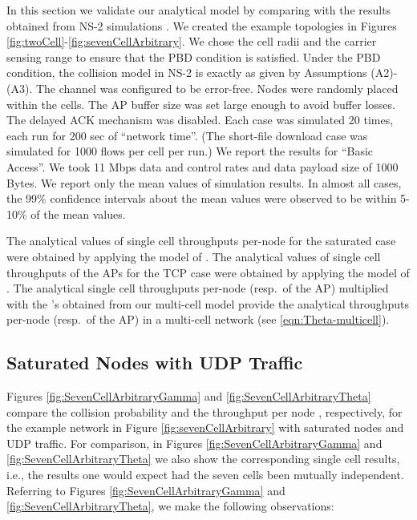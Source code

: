 \documentclass[10pt,a4paper,journal]{IEEEtran}
\theoremstyle{definition}
\theoremstyle{remark}
\theoremstyle{plain}
\begin{document}
In this section we validate our analytical model by comparing with the results obtained from NS-2 simulations \cite{wanet.ns2}. We created the example topologies in Figures \ref{fig:twoCell}-\ref{fig:sevenCellArbitrary}. We chose the cell radii and the carrier sensing range to ensure that the PBD condition is satisfied. Under the PBD condition, the collision model in NS-2 is exactly as given by Assumptions (A2)-(A3). The channel was configured to be error-free. Nodes were randomly placed within the cells. The AP buffer size was set large enough to avoid buffer losses. The delayed ACK mechanism was disabled. Each case was simulated 20 times, each run for 200 sec of ``network time''. (The short-file download case was simulated for 1000 flows per cell per run.) We report the results for ``Basic Access''. We took 11 Mbps data and control rates and data payload size of 1000 Bytes. We report only the mean values of simulation results. In almost all cases, the 99\% confidence intervals about the mean values were observed to be within 5-10\% of the mean values.








The analytical values of single cell throughputs per-node for the saturated case were obtained by applying the model of \cite{wanet.kumar_etal07new_insights}. The analytical values of single cell throughputs of the APs for the TCP case were obtained by applying the model of \cite{wanet.bruno08TCPeqvSatModel}. The analytical single cell throughputs per-node (resp.~of the AP) multiplied with the 's obtained from our multi-cell model provide the analytical throughputs per-node (resp.~of the AP) in a multi-cell network (see \eqref{eqn:Theta-multicell}).






\subsection{Saturated Nodes with UDP Traffic}
\label{subsec:results-saturated}

Figures \ref{fig:SevenCellArbitraryGamma} and \ref{fig:SevenCellArbitraryTheta} compare the collision probability  and the throughput per node , respectively, for the example network in Figure \ref{fig:sevenCellArbitrary} with saturated nodes and UDP traffic. For comparison, in Figures \ref{fig:SevenCellArbitraryGamma} and \ref{fig:SevenCellArbitraryTheta} we also show the corresponding single cell results, i.e., the results one would expect had the seven cells been mutually independent. Referring to Figures \ref{fig:SevenCellArbitraryGamma} and \ref{fig:SevenCellArbitraryTheta}, we make the following observations: 
\end{document}
